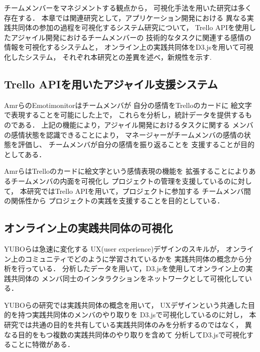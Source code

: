 チームメンバーをマネジメントする観点から，
可視化手法を用いた研究は多く存在する．
本章では関連研究として，アプリケーション開発における
異なる実践共同体の参加の過程を可視化するシステム研究について，
Trello APIを使用したアジャイル開発におけるチームメンバーの
技術的なタスクに関連する感情の情報を可視化するシステムと，
オンライン上の実践共同体をD3.jsを用いて可視化したシステム，
それぞれ本研究との差異を述べ，新規性を示す.

\subsection{Trello APIを用いたアジャイル支援システム}
AmrらのEmotimonitor\cite{Emotimonitor}はチームメンバが
自分の感情をTrelloのカードに
絵文字で表現することを可能にした上で，
これらを分析し，統計データを提供するものである．
上記の機能により，アジャイル開発におけるタスクに関する
メンバの感情状態を認識できることにより，
マネージャーがチームメンバの感情の状態を評価し、
チームメンバが自分の感情を振り返ることを
支援することが目的としてある．

AmrらはTrelloのカードに絵文字という感情表現の機能を
拡張することによりあるチームメンバの内面を可視化し
プロジェクトの管理を支援しているのに対して，
本研究ではTrello APIを用いて，プロジェクトに参加する
チームメンバ間の関係性から
プロジェクトの実践を支援することを目的としている．　　　
\subsection{オンライン上の実践共同体の可視化}
YUBOら\cite{D3jsOfCop}は急速に変化する
UX(user experience)デザインのスキルが，
オンライン上のコミュニティでどのように学習されているかを
実践共同体の概念から分析を行っている．
分析したデータを用いて，D3.jsを使用してオンライン上の実践共同体の
メンバ同士のインタラクションをネットワークとして可視化している．

YUBOらの研究では実践共同体の概念を用いて，
UXデザインという共通した目的を持つ実践共同体のメンバのやり取りを
D3.jsで可視化しているのに対し，
本研究では共通の目的を共有している実践共同体のみを分析するのではなく，
異なる目的をもつ複数の実践共同体のやり取りを含めて
分析してD3.jsで可視化することに特徴がある．
